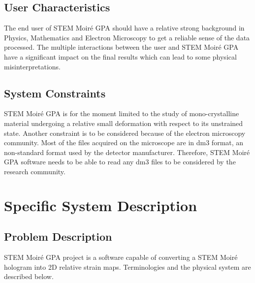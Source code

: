 \documentclass[12pt]{article}
\newcommand{\progname}{STEM Moir{\'e} GPA}
\begin{document}

\subsection{User Characteristics} \label{SecUserCharacteristics}

The end user of \progname{} should have a relative strong background in Physics,
Mathematics and Electron Microscopy to get a reliable sense of the data
processed. The multiple interactions between the user and \progname{} have a
significant impact on the final results which can lead to some physical
misinterpretations. 

\subsection{System Constraints}

\progname{} is for the moment limited to the study of mono-crystalline material
undergoing a relative small deformation with respect to its unstrained state.
 Another constraint is to be
considered because of the electron microscopy community. Most of the files
acquired on the microscope are in dm3 format, an non-standard format used by the
detector manufacturer. Therefore, \progname{} software needs to be able to read
any dm3 files to be considered by the research community.

\section{Specific System Description}
\subsection{Problem Description} \label{Sec_pd}

STEM Moir{\'e} GPA project is a software capable of converting a STEM Moir{\'e} 
hologram into 2D relative strain maps. Terminologies and the physical system are described below.
\end{document}
